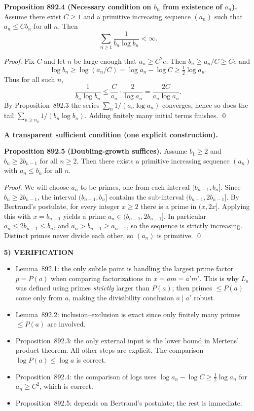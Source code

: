 \medskip
\noindent\textbf{Proposition 892.4 (Necessary condition on $b_n$ from existence of $a_n$).}
Assume there exist $C\ge 1$ and a primitive increasing sequence $(a_n)$ such that
$a_n\le C b_n$ for all $n$. Then
\[ \sum_{n\ge 1} \frac{1}{b_n\log b_n} <\infty. \]

\emph{Proof.}
Fix $C$ and let $n$ be large enough that $a_n\ge C^2e$.
Then $b_n\ge a_n/C\ge Ce$ and
\[ \log b_n \ge \log(a_n/C)=\log a_n -\log C \ge \tfrac12\log a_n. \]
Thus for all such $n$,
\[
\frac{1}{b_n\log b_n}
\le \frac{C}{a_n}\cdot\frac{2}{\log a_n}
= \frac{2C}{a_n\log a_n}.
\]
By Proposition~892.3 the series $\sum_n 1/(a_n\log a_n)$ converges, hence so does
the tail $\sum_{n\ge n_0} 1/(b_n\log b_n)$. Adding finitely many initial terms
finishes.
\qed

\medskip
\textbf{A transparent sufficient condition (one explicit construction).}

\noindent\textbf{Proposition 892.5 (Doubling-growth suffices).}
Assume $b_1\ge 2$ and $b_{n}\ge 2b_{n-1}$ for all $n\ge 2$.
Then there exists a primitive increasing sequence $(a_n)$ with $a_n\le b_n$ for
all $n$.

\emph{Proof.}
We will choose $a_n$ to be primes, one from each interval $(b_{n-1},b_n]$.
Since $b_n\ge 2b_{n-1}$, the interval $(b_{n-1},b_n]$ contains the sub-interval
$(b_{n-1},2b_{n-1}]$.
By Bertrand’s postulate, for every integer $x\ge 2$ there is a prime in
$(x,2x]$. Applying this with $x=b_{n-1}$ yields a prime $a_n\in(b_{n-1},2b_{n-1}]$.
In particular $a_n\le 2b_{n-1}\le b_n$, and $a_n>b_{n-1}\ge a_{n-1}$, so the
sequence is strictly increasing.
Distinct primes never divide each other, so $(a_n)$ is primitive.
\qed

\medskip
\noindent\textbf{5) VERIFICATION}

\begin{itemize}
\item Lemma~892.1: the only subtle point is handling the largest prime factor
$p=P(a)$ when comparing factorizations in $x=am=a'm'$. This is why $L_a$ was
defined using primes \emph{strictly} larger than $P(a)$; then primes $\le P(a)$
come only from $a$, making the divisibility conclusion $a\mid a'$ robust.
\item Lemma~892.2: inclusion--exclusion is exact since only finitely many primes
$\le P(a)$ are involved.
\item Proposition~892.3: the only external input is the lower bound in Mertens’
product theorem. All other steps are explicit. The comparison
$\log P(a)\le \log a$ is correct.
\item Proposition~892.4: the comparison of logs uses $\log a_n -\log C\ge \tfrac12\log a_n$
for $a_n\ge C^2$, which is correct.
\item Proposition~892.5: depends on Bertrand’s postulate; the rest is immediate.
\end{itemize}

